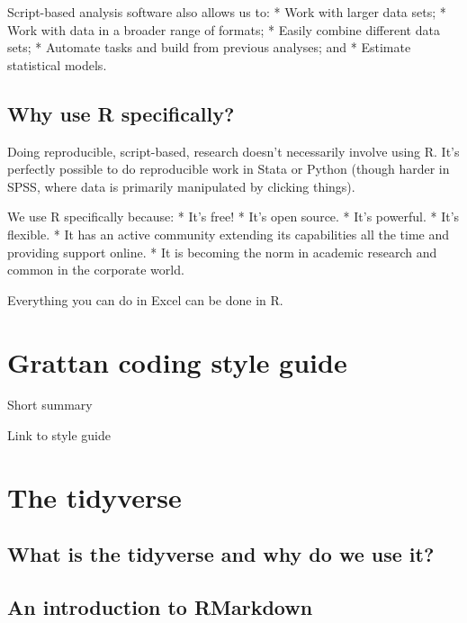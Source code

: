 \documentclass[]{book}
\begin{document}
Script-based analysis software also allows us to:
* Work with larger data sets;
* Work with data in a broader range of formats;
* Easily combine different data sets;
* Automate tasks and build from previous analyses; and
* Estimate statistical models.

\hypertarget{why-R}{%
\section{Why use R specifically?}\label{why-R}}

Doing reproducible, script-based, research doesn't necessarily involve using R. It's perfectly possible to do reproducible work in Stata or Python (though harder in SPSS, where data is primarily manipulated by clicking things).

We use R specifically because:
* It's free!
* It's open source.
* It's powerful.
* It's flexible.
* It has an active community extending its capabilities all the time and providing support online.
* It is becoming the norm in academic research and common in the corporate world.

Everything you can do in Excel can be done in R.

\hypertarget{grattan-coding-style-guide}{%
\chapter{Grattan coding style guide}\label{grattan-coding-style-guide}}

Short summary

Link to style guide

\hypertarget{the-tidyverse}{%
\chapter{The tidyverse}\label{the-tidyverse}}

\hypertarget{what-is-the-tidyverse-and-why-do-we-use-it}{%
\section{What is the tidyverse and why do we use it?}\label{what-is-the-tidyverse-and-why-do-we-use-it}}

\hypertarget{an-introduction-to-rmarkdown}{%
\section{An introduction to RMarkdown}\label{an-introduction-to-rmarkdown}}
\end{document}

